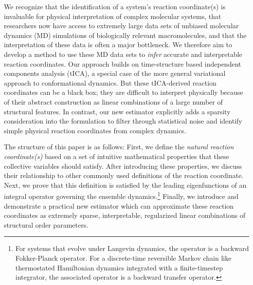 \documentclass[aip, jcp, preprint, linenumbers, nofootinbib]{revtex4-1}
\begin{document}

We recognize that the identification of a system's reaction coordinate(s) is invaluable for physical interpretation of complex molecular systems, that researchers now have access to extremely large data sets of unbiased molecular dynamics (MD) simulations of biologically relevant macromolecules, and that the interpretation of these data is often a major bottleneck.\cite{lane2013milliseconds} We therefore aim to develop a method to use these MD data sets to \emph{infer} accurate and interpretable reaction coordinates. Our approach builds on time-structure based independent components analysis (tICA), a special case of the more general variational approach to conformational dynamics.\cite{schwantes2013improvements, perez2013identification} But these tICA-derived reaction coordinates can be a black box; they are difficult to interpret physically because of their abstract construction as linear combinations of a large number of structural features. In contrast, our new estimator explicitly adds a sparsity consideration into the formulation to filter through statistical noise and identify simple physical reaction coordinates from complex dynamics.

The structure of this paper is as follows: First, we define the \emph{natural reaction coordinate(s)} based on a set of intuitive mathematical properties that these collective variables should satisfy. After introducing these properties, we discuss their relationship to other commonly used definitions of the reaction coordinate. Next, we prove that this definition is satisfied by the leading eigenfunctions of an integral operator governing the ensemble dynamics.\footnote{For systems that evolve under Langevin dynamics, the operator is a backward Fokker-Planck operator.\cite{coifman2008diffusion} For a discrete-time reversible Markov chain like thermostated Hamiltonian dynamics integrated with a finite-timestep integrator, the associated operator is a backward transfer operator.\cite{schutte2001transfer}} Finally, we introduce and demonstrate a practical new estimator which can approximate these reaction coordinates as extremely sparse, interpretable, regularized linear combinations of structural order parameters.

\end{document}
